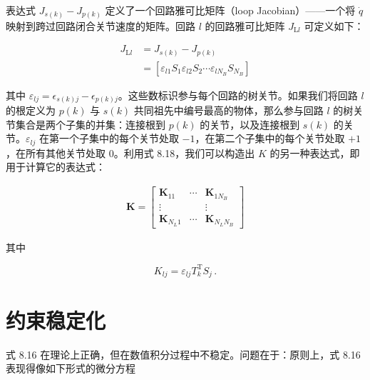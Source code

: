 \documentclass[10pt,a4paper]{book}
\theoremstyle{thmstyle} %
\theoremstyle{defstyle} %
\theoremstyle{prostyle} %
\begin{document}
表达式 $J_{s(k)} - J_{p(k)}$ 定义了一个回路雅可比矩阵（loop Jacobian）——一个将 $\dot{q}$ 映射到跨过回路闭合关节速度的矩阵。回路 $l$ 的回路雅可比矩阵 $J_{\mathrm{L}l}$ 可定义如下：



$$
\begin{array}{rl} { J _ { \mathrm { L } l } } & { = J _ { s ( k ) } - J _ { p ( k ) } } \\& { = \left[ \varepsilon _ { l 1 } S _ { 1 }  \varepsilon _ { l 2 } S _ { 2 }  \cdots  \varepsilon _ { l N _ { B } } S _ { N _ { B } } \right] } \end{array}
$$



其中 $\varepsilon_{lj}=\epsilon_{s(k)j}-\epsilon_{p(k)j}$。这些数标识参与每个回路的树关节。如果我们将回路 $l$ 的根定义为 $p(k)$ 与 $s(k)$ 共同祖先中编号最高的物体，那么参与回路 $l$ 的树关节集合是两个子集的并集：连接根到 $p(k)$ 的关节，以及连接根到 $s(k)$ 的关节。$\varepsilon_{lj}$ 在第一个子集中的每个关节处取 $-1$，在第二个子集中的每个关节处取 $+1$，在所有其他关节处取 0。利用式 8.18，我们可以构造出 $K$ 的另一种表达式，即用于计算它的表达式：



$$
\begin{array}{r} { \boldsymbol{ K } = \left[ \begin{array}{lll} { \boldsymbol{ K } _ { 11 } } & { \cdots } & { \boldsymbol{ K } _ { 1 N _ { B } } } \\{ \vdots } & & { \vdots } \\{ \boldsymbol{ K } _ { N _ { L } 1 } } & { \cdots } & { \boldsymbol{ K } _ { N _ { L } N _ { B } } } \end{array} \right] } \end{array}
$$



其中



$$
K _ { l j } = \varepsilon _ { l j } T _ { k } ^{\mathrm { T} } S _ { j } \, .
$$



\section{约束稳定化}





式 8.16 在理论上正确，但在数值积分过程中不稳定。问题在于：原则上，式 8.16 表现得像如下形式的微分方程
\end{document}

